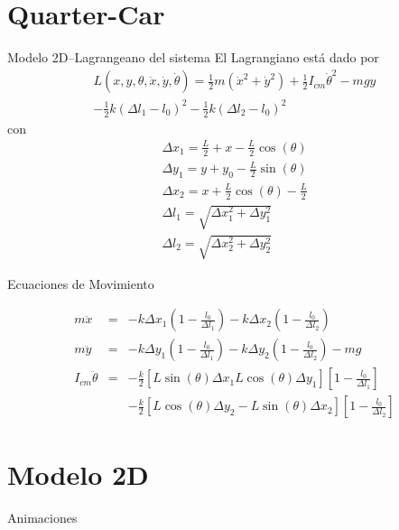 \documentclass{beamer}
\begin{document}
\section{Quarter-Car}
\begin{frame}{Modelo 2D--Lagrangeano del sistema}
El Lagrangiano está dado por
\begin{multline*}
L(x,y,\theta,\dot x,\dot y,\dot \theta)= \frac{1}{2}m(\dot x^2 +  \dot y^2)+ \frac{1}{2} I_{cm} \dot \theta^2-mgy\\
-\frac{1}{2}k(\Delta l_{1}-l_{0})^2-\frac{1}{2}k(\Delta l_{2}-l_{0})^2 
\end{multline*}
con 
\begin{eqnarray*}
\Delta x_{1} = \frac{L}{2}+ x - \frac{L}{2} \cos(\theta) \\ 
\Delta y_{1} =   y +  y_{0} - \frac{L}{2}  \sin(\theta) \\ 
\Delta x_{2} = x + \frac{L}{2}  \cos(\theta)-\frac{L}{2}\\ 
\Delta l_{1} = \sqrt  {\Delta x_{1}^2+ \Delta y_{1}^2} %
\\ 
\Delta l_{2} =  \sqrt  {\Delta x_{2}^2+ \Delta y_{2}^2}
\end{eqnarray*}

\end{frame}
\begin{frame}{Ecuaciones de Movimiento}

  \begin{eqnarray*}
  m\ddot x  & = & -k \Delta x_{1} (1 - \frac {l_{0}}{\Delta l_{1}}) - k \Delta x_{2} (1-\frac {l_{0}}{\Delta l_{2}})   
  \\m\ddot y  & =&  -k \Delta y_{1} (1 - \frac {l_{0}}{\Delta l_{1}}) - k \Delta y_{2} (1-\frac {l_{0}}{\Delta l_{2}}) - mg
  \\I_{cm}\ddot \theta  & = &  -\frac{k}{2}[L\sin(\theta) \Delta x_{1} L\cos(\theta) \Delta y_{1}][1- \frac{l_{0}}{\Delta l_{1}}]\\
 & &  -\frac{k}{2}[L\cos(\theta)\Delta y_{2}-L \sin(\theta)\Delta x_{2} ][1- \frac{l_{0}}{\Delta l_{2}}]  
  \end{eqnarray*}
  
\end{frame}
\section{Modelo 2D}
\begin{frame}{Animaciones}
\vskip 1cm
\end{frame}
\end{document}
